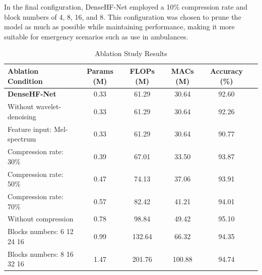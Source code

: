 In the final configuration, DenseHF-Net employed a 10\% compression rate and block numbers of 4, 8, 16, and 8. This configuration was chosen to prune the model as much as possible while maintaining performance, making it more suitable for emergency scenarios such as use in ambulances.
\begin{table}[htbp]
    \centering
    \caption{Ablation Study Results}
    \label{table:ablation_results}
    \begin{tabularx}{\textwidth}{L|CCCCC}
    \toprule
    Ablation Condition & Params (M) & FLOPs (M) & MACs (M) & Accuracy (\%) \\ 
    \midrule
    \textbf{DenseHF-Net }           &0.33& 61.29& 30.64& 92.60 \\
    Without wavelet-denoising  &0.33& 61.29& 30.64& 92.26 \\
    Feature input: Mel-spectrum &0.33& 61.29& 30.64& 90.77\\
   Compression rate: 30\%& 0.39& 67.01& 33.50&93.87\\
   Compression rate: 50\%& 0.47& 74.13 & 37.06&93.91\\
   Compression rate: 70\%& 0.57& 82.42 & 41.21&94.01\\
   Without compression &0.78& 98.84& 49.42& 95.10\\
    Blocks numbers: 6 12 24 16  & 0.99    & 132.64     & 66.32     & 94.35  \\
    Blocks numbers: 8 16 32 16  & 1.47    & 201.76      & 100.88    & 94.74  \\
    \bottomrule
    \end{tabularx}
\end{table}